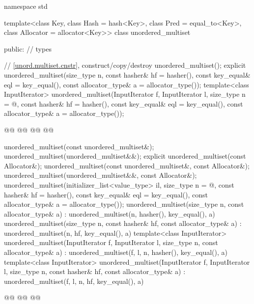 \documentclass{wg21}
\begin{document}
%
\begin{codeblock}
namespace std {
template<class Key,
class Hash = hash<Key>,
class Pred = equal_to<Key>,
class Allocator = allocator<Key>>
class unordered_multiset {
    public:
    // types
    
    // \ref{unord.multiset.cnstr}, construct/copy/destroy
    unordered_multiset();
    explicit unordered_multiset(size_type n,
    const hasher& hf = hasher(),
    const key_equal& eql = key_equal(),
    const allocator_type& a = allocator_type());
    template<class InputIterator>
    unordered_multiset(InputIterator f, InputIterator l,
        size_type n = @\seebelow@,
        const hasher& hf = hasher(),
        const key_equal& eql = key_equal(),
        const allocator_type& a = allocator_type());
    
    @@
    @@
    @@
    @@
    
    unordered_multiset(const unordered_multiset&);
    unordered_multiset(unordered_multiset&&);
    explicit unordered_multiset(const Allocator&);
    unordered_multiset(const unordered_multiset&, const Allocator&);
    unordered_multiset(unordered_multiset&&, const Allocator&);
    unordered_multiset(initializer_list<value_type> il,
        size_type n = @\seebelow@,
        const hasher& hf = hasher(),
        const key_equal& eql = key_equal(),
        const allocator_type& a = allocator_type());
    unordered_multiset(size_type n, const allocator_type& a)
    : unordered_multiset(n, hasher(), key_equal(), a) { }
    unordered_multiset(size_type n, const hasher& hf, const allocator_type& a)
    : unordered_multiset(n, hf, key_equal(), a) { }
    template<class InputIterator>
    unordered_multiset(InputIterator f, InputIterator l, size_type n, const allocator_type& a)
    : unordered_multiset(f, l, n, hasher(), key_equal(), a) { }
    template<class InputIterator>
    unordered_multiset(InputIterator f, InputIterator l, size_type n, const hasher& hf,
    const allocator_type& a)
    : unordered_multiset(f, l, n, hf, key_equal(), a) { }
    
    @@
    @@
    @@
    
}}
\end{codeblock}
\end{document}
